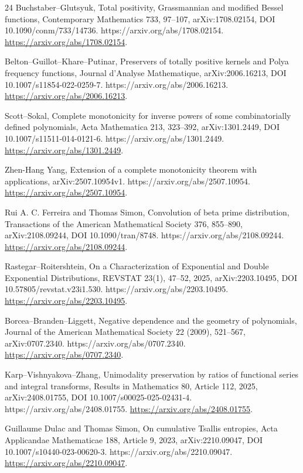 \documentclass[11pt]{article}
\numberwithin{equation}{section}
\theoremstyle{definition}
\theoremstyle{remark}
\newcommand{\1}{\mathbf 1}
\begin{document}
\begin{thebibliography}{24}
Buchstaber--Glutsyuk, Total positivity, Grassmannian and modified Bessel functions, Contemporary Mathematics 733, 97--107, arXiv:1708.02154, DOI 10.1090/conm/733/14736. https://arxiv.org/abs/1708.02154.
\url{https://arxiv.org/abs/1708.02154}.

Belton--Guillot--Khare--Putinar, Preservers of totally positive kernels and Polya frequency functions, Journal d'Analyse Mathematique, arXiv:2006.16213, DOI 10.1007/s11854-022-0259-7. https://arxiv.org/abs/2006.16213.
\url{https://arxiv.org/abs/2006.16213}.

Scott--Sokal, Complete monotonicity for inverse powers of some combinatorially defined polynomials, Acta Mathematica 213, 323--392, arXiv:1301.2449, DOI 10.1007/s11511-014-0121-6. https://arxiv.org/abs/1301.2449.
\url{https://arxiv.org/abs/1301.2449}.

Zhen-Hang Yang, Extension of a complete monotonicity theorem with applications, arXiv:2507.10954v1. https://arxiv.org/abs/2507.10954.
\url{https://arxiv.org/abs/2507.10954}.

Rui A. C. Ferreira and Thomas Simon, Convolution of beta prime distribution, Transactions of the American Mathematical Society 376, 855--890, arXiv:2108.09244, DOI 10.1090/tran/8748. https://arxiv.org/abs/2108.09244.
\url{https://arxiv.org/abs/2108.09244}.

Rastegar--Roitershtein, On a Characterization of Exponential and Double Exponential Distributions, REVSTAT 23(1), 47--52, 2025, arXiv:2203.10495, DOI 10.57805/revstat.v23i1.530. https://arxiv.org/abs/2203.10495.
\url{https://arxiv.org/abs/2203.10495}.

Borcea--Branden--Liggett, Negative dependence and the geometry of polynomials, Journal of the American Mathematical Society 22 (2009), 521--567, arXiv:0707.2340. https://arxiv.org/abs/0707.2340.
\url{https://arxiv.org/abs/0707.2340}.

Karp--Vishnyakova--Zhang, Unimodality preservation by ratios of functional series and integral transforms, Results in Mathematics 80, Article 112, 2025, arXiv:2408.01755, DOI 10.1007/s00025-025-02431-4. https://arxiv.org/abs/2408.01755.
\url{https://arxiv.org/abs/2408.01755}.

Guillaume Dulac and Thomas Simon, On cumulative Tsallis entropies, Acta Applicandae Mathematicae 188, Article 9, 2023, arXiv:2210.09047, DOI 10.1007/s10440-023-00620-3. https://arxiv.org/abs/2210.09047.
\url{https://arxiv.org/abs/2210.09047}.


\end{thebibliography}
\end{document}
